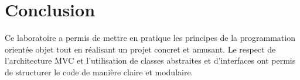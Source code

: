 \documentclass[12pt]{report}
\begin{document}

    \section*{Conclusion}
    Ce laboratoire a permis de mettre en pratique les principes de la programmation orientée objet tout en réalisant un projet concret et amusant. Le respect de l'architecture MVC et l'utilisation de classes abstraites et d'interfaces ont permis de structurer le code de manière claire et modulaire.
\end{document}
